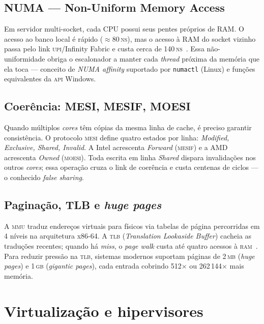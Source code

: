 \subsection{NUMA --- Non-Uniform Memory Access}

Em servidor multi-socket, cada CPU possui seus pentes próprios de
RAM. O acesso ao banco local é rápido ($\approx 80$\,\textsc{ns}),
mas o acesso à RAM do socket vizinho passa pelo link
\textsc{upi}/Infinity Fabric e custa cerca de 140\,\textsc{ns}~\cite{stallings2017}.
Essa não-uniformidade obriga o escalonador a manter cada
\emph{thread} próxima da memória que ela toca --- conceito de
\textit{NUMA affinity} suportado por \texttt{numactl} (Linux) e
funções equivalentes da \textsc{api} Windows.

\subsection{Coerência: MESI, MESIF, MOESI}

Quando múltiplos \emph{cores} têm cópias da mesma linha de cache, é
preciso garantir consistência. O protocolo \textsc{mesi} define
quatro estados por linha: \emph{Modified, Exclusive, Shared, Invalid}.
A Intel acrescenta \emph{Forward} (\textsc{mesif}) e a AMD acrescenta
\emph{Owned} (\textsc{moesi}). Toda escrita em linha
\emph{Shared} dispara invalidações nos outros \emph{cores}; essa
operação cruza o link de coerência e custa centenas de
ciclos --- o conhecido \textit{false sharing}.

\subsection{Paginação, TLB e \textit{huge pages}}

A \textsc{mmu} traduz endereços virtuais para físicos via tabelas de
página percorridas em 4 níveis na arquitetura x86-64. A \textsc{tlb}
(\emph{Translation Lookaside Buffer}) cacheia as traduções
recentes; quando há \textit{miss}, o \textit{page walk} custa até
quatro acessos à \textsc{ram}~\cite{silberschatz2015}. Para reduzir
pressão na \textsc{tlb}, sistemas modernos suportam páginas de
2\,\textsc{mb} (\textit{huge pages}) e 1\,\textsc{gb}
(\textit{gigantic pages}), cada entrada cobrindo 512$\times$ ou
262\,144$\times$ mais memória.

\section{Virtualização e hipervisores}
\label{sec:ref-virtualizacao}

